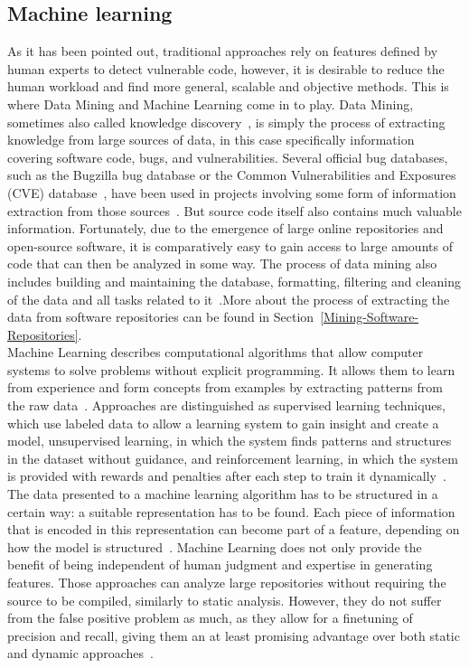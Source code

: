 \documentclass[
a4paper,
pagesize,
pdftex,
12pt,
twoside, %
BCOR=5mm, %
ngerman,
fleqn,
final,
]{scrartcl}
\begin{document}
	\subsection{Machine learning} 
	As it has been pointed out, traditional approaches rely on features defined by human experts to detect vulnerable code, however, it is desirable to reduce the human workload and find more general, scalable and objective methods. This is where Data Mining and Machine Learning come in to play. Data Mining, sometimes also called knowledge discovery~\cite{Mitchell.1999}, is simply the process of extracting knowledge from large sources of data, in this case specifically information covering software code, bugs, and vulnerabilities. Several official bug databases, such as the Bugzilla bug database or the Common Vulnerabilities and Exposures (CVE) database~\cite{CVE}, have been used in projects involving some form of information extraction from those sources~\cite{Wijayasekara.2012}. But source code itself also contains much valuable information. Fortunately, due to the emergence of large online repositories and open-source software, it is comparatively easy to gain access to large amounts of code that can then be analyzed in some way. The process of data mining also includes building and maintaining the database, formatting, filtering and cleaning of the data and all tasks related to it~\cite{Mitchell.1999}.More about the process of extracting the data from software repositories can be found in Section~\ref{Mining-Software-Repositories}.\\
	Machine Learning describes computational algorithms that allow computer systems to solve problems without explicit programming. It allows them to learn from experience and form concepts from examples by extracting patterns from the raw data~\cite{Goodfellow.2016}. Approaches are distinguished as supervised learning techniques, which use labeled data to allow a learning system to gain insight and create a model, unsupervised learning, in which the system finds patterns and structures in the dataset without guidance, and reinforcement learning, in which the system is provided with rewards and penalties after each step to train it dynamically~\cite{Mitchell.1997}.\\
	The data presented to a machine learning algorithm has to be structured in a certain way: a suitable representation has to be found. Each piece of information that is encoded in this representation can become part of a feature, depending on how the model is structured~\cite{Goodfellow.2016}. 
	Machine Learning does not only provide the benefit of being independent of human judgment and expertise in generating features. Those approaches can analyze large repositories without requiring the source to be compiled, similarly to static analysis. However, they do not suffer from the false positive problem as much, as they allow for a finetuning of precision and recall, giving them an at least promising advantage over both static and dynamic approaches~\cite{Russell.2018}. \\
\end{document}
